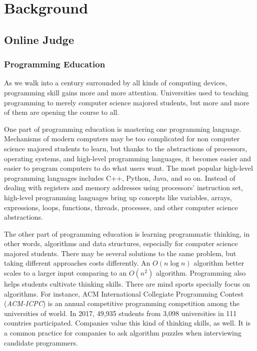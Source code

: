 
\chapter{Background}



\section{Online Judge}
    
    \subsection{Programming Education}

        As we walk into a century surrounded by all kinds of computing devices,
        programming skill gains more and more attention.
        Universities used to teaching programming to merely computer science majored students,
        but more and more of them are opening the course to all.

        One part of programming education is mastering one programming language.
        Mechanisms of modern computers may be too complicated for non computer science majored students to learn,
        but thanks to the abstractions of processors, operating systems, and high-level programming languages,
        it becomes easier and easier to program computers to do what users want.
        The most popular high-level programming languages includes C++, Python, Java, and so on.
        Instead of dealing with registers and memory addresses using processors' instruction set,
        high-level programming languages bring up concepts like variables, arrays, expressions, loops, functions,
        threads, processes, and other computer science abstractions.

        The other part of programming education is learning programmatic thinking, in other words,
        algorithms and data structures, especially for computer science majored students.
        There may be several solutions to the same problem, but taking different approaches costs differently.
        An $O(n\log n)$ algorithm better scales to a larger input comparing to an $O(n^2)$ algorithm.
        Programming also helps students cultivate thinking skills.
        There are mind sports specially focus on algorithms.
        For instance, ACM International Collegiate Programming Contest (\emph{ACM-ICPC}) is an annual
        competitive programming competition among the universities of world.
        In 2017, 49,935 students from 3,098 universities in 111 countries participated. \cite{acmicpc_fact_sheet}
        Companies value this kind of thinking skills, as well.
        It is a common practice for companies to ask algorithm puzzles when interviewing candidate programmers.

